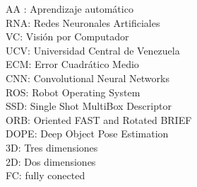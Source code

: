 AA : Aprendizaje automático \\
RNA: Redes Neuronales Artificiales \\
VC: Visión por Computador\\
UCV: Universidad Central de Venezuela\\
ECM: Error Cuadrático Medio \\
CNN: Convolutional Neural Networks\\
ROS: Robot Operating System\\
SSD: Single Shot MultiBox Descriptor\\
ORB: Oriented FAST and Rotated BRIEF\\
DOPE: Deep Object Pose Estimation \\
3D: Tres dimensiones\\
2D: Dos dimensiones \\
FC: fully conected \\
